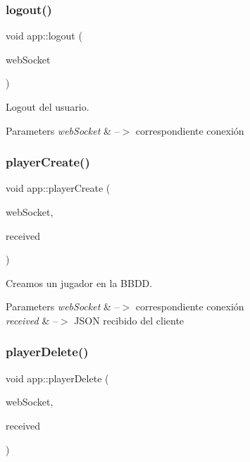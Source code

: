 \subsubsection{\texorpdfstring{logout()}{logout()}}
{\footnotesize\ttfamily void app\+::logout (\begin{DoxyParamCaption}\item[{ix\+::\+Web\+Socket $\ast$}]{web\+Socket }\end{DoxyParamCaption})}



Logout del usuario. 


\begin{DoxyParams}{Parameters}
{\em web\+Socket} & --$>$ correspondiente conexión \\
\hline
\end{DoxyParams}
\mbox{\label{classapp_a6f44f304590371aa8aae2a2e7b504a64}} 
\subsubsection{\texorpdfstring{player\+Create()}{playerCreate()}}
{\footnotesize\ttfamily void app\+::player\+Create (\begin{DoxyParamCaption}\item[{ix\+::\+Web\+Socket $\ast$}]{web\+Socket,  }\item[{J\+S\+ON}]{received }\end{DoxyParamCaption})}



Creamos un jugador en la B\+B\+DD. 


\begin{DoxyParams}{Parameters}
{\em web\+Socket} & --$>$ correspondiente conexión \\
\hline
{\em received} & --$>$ J\+S\+ON recibido del cliente \\
\hline
\end{DoxyParams}
\mbox{\label{classapp_a0c9c869259ac2e2362fd84e9a043395f}} 
\subsubsection{\texorpdfstring{player\+Delete()}{playerDelete()}}
{\footnotesize\ttfamily void app\+::player\+Delete (\begin{DoxyParamCaption}\item[{ix\+::\+Web\+Socket $\ast$}]{web\+Socket,  }\item[{J\+S\+ON}]{received }\end{DoxyParamCaption})}



